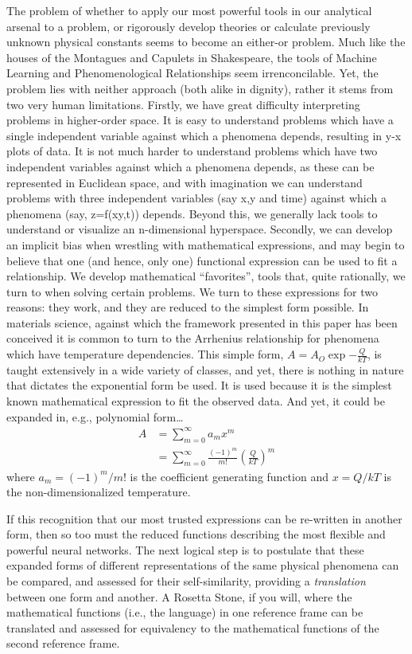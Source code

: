 The problem of whether to apply our most powerful tools in our analytical arsenal to a problem, or rigorously develop theories or calculate previously unknown physical constants seems to become an either-or problem.  Much like the houses of the Montagues and Capulets in Shakespeare, the tools of Machine Learning and Phenomenological Relationships seem irrenconcilable. Yet, the problem lies with neither approach (both alike in dignity), rather it stems from two very human limitations. Firstly, we have great difficulty interpreting problems in higher-order space.  It is easy to understand problems which have a single independent variable against which a phenomena depends, resulting in y-x plots of data.  It is not much harder to understand problems which have two independent variables against which a phenomena depends, as these can be represented in Euclidean space, and with imagination we can understand problems with three independent variables (say x,y and time) against which a phenomena (say, z=f(xy,t)) depends.  Beyond this, we generally lack tools to understand or visualize an n-dimensional hyperspace.  Secondly, we can develop an implicit bias when wrestling with mathematical expressions, and may begin to believe that one (and hence, only one) functional expression can be used to fit a relationship.  We develop mathematical ``favorites'', tools that, quite rationally, we turn to when solving certain problems.  We turn to these expressions for two reasons: they work, and they are reduced to the simplest form possible.  In materials science, against which the framework presented in this paper has been conceived it is common to turn to the Arrhenius relationship for phenomena which have temperature dependencies.  This simple form, $A = A_O\exp{-\frac{Q}{kT}}$, is taught extensively in a wide variety of classes, and yet, there is nothing in nature that dictates the exponential form be used.  It is used because it is the simplest known mathematical expression to fit the observed data.  And yet, it could be expanded in, e.g., polynomial form\ldots
\begin{align}
    A &= \sum_{m=0}^\infty a_m x^m \nonumber\\
        &= \sum_{m=0}^\infty \frac{(-1)^m}{m!} \left(\frac{Q}{kT}\right)^m
\label{eqn:coefficient generating function example}
\end{align}
\noindent where $a_m = (-1)^m/m!$ is the coefficient generating function and $x = Q/kT$ is the non-dimensionalized temperature.

If this recognition that our most trusted expressions can be re-written in another form, then so too must the reduced functions describing the most flexible and powerful neural networks.  The next logical step is to postulate that these expanded forms of different representations of the same physical phenomena can be compared, and assessed for their self-similarity, providing a \textit{translation} between one form and another.  A Rosetta Stone, if you will, where the mathematical functions (i.e., the language) in one reference frame can be translated and assessed for equivalency to the mathematical functions of the second reference frame.

